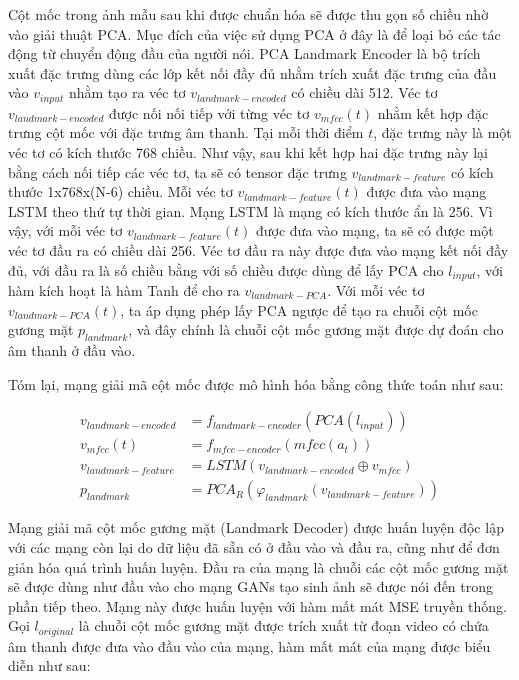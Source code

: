 Cột mốc trong ảnh mẫu sau khi được chuẩn hóa sẽ được thu gọn số chiều nhờ vào giải thuật PCA. Mục đích của việc sử dụng PCA ở đây là để loại bỏ các tác động từ chuyển động đầu của người nói. PCA Landmark Encoder là bộ trích xuất đặc trưng dùng các lớp kết nối đầy đủ nhằm trích xuất đặc trưng của đầu vào $v_{input}$ nhằm tạo ra véc tơ $v_{landmark-encoded}$ có chiều dài 512. Véc tơ $v_{landmark-encoded}$ được nối nối tiếp với từng véc tơ $v_{mfcc}(t)$ nhằm kết hợp đặc trưng cột mốc với đặc trưng âm thanh. Tại mỗi thời điểm $t$, đặc trưng này là một véc tơ có kích thước 768 chiều. Như vậy, sau khi kết hợp hai đặc trưng này lại bằng cách nối tiếp các véc tơ, ta sẽ có tensor đặc trưng $v_{landmark-feature}$ có kích thước 1x768x(N-6) chiều. Mỗi véc tơ $v_{landmark-feature}(t)$ được đưa vào mạng LSTM theo thứ tự thời gian. Mạng LSTM là mạng có kích thước ẩn là 256. Vì vậy, với mỗi véc tơ $v_{landmark-feature}(t)$ được đưa vào mạng, ta sẽ có được một véc tơ đầu ra có chiều dài 256. Véc tơ đầu ra này được đưa vào mạng kết nối đầy đủ, với đầu ra là số chiều bằng với số chiều được dùng để lấy PCA cho $l_{input}$, với hàm kích hoạt là hàm Tanh để cho ra $v_{landmark-PCA}$. Với mỗi véc tơ $v_{landmark-PCA}(t)$, ta áp dụng phép lấy PCA ngược để tạo ra chuỗi cột mốc gương mặt $p_{landmark}$, và đây chính là chuỗi cột mốc gương mặt được dự đoán cho âm thanh ở đầu vào.

Tóm lại, mạng giải mã cột mốc được mô hình hóa bằng công thức toán như sau:

\begin{equation}
    \begin{split}
    v_{landmark-encoded} &= f_{landmark-encoder}(PCA(l_{input}))\\
    v_{mfcc}(t) &= f_{mfcc-encoder}(mfcc(a_t))\\
    v_{landmark-feature} &= LSTM(v_{landmark-encoded} \oplus v_{mfcc})\\
    p_{landmark} &= PCA_R(\varphi_{landmark}(v_{landmark-feature}))
    \end{split}
\end{equation}

Mạng giải mã cột mốc gương mặt (Landmark Decoder) được huấn luyện độc lập với các mạng còn lại do dữ liệu đã sẵn có ở đầu vào và đầu ra, cũng như để đơn giản hóa quá trình huấn luyện. Đầu ra của mạng là chuỗi các cột mốc gương mặt sẽ được dùng như đầu vào cho mạng GANs tạo sinh ảnh sẽ được nói đến trong phần tiếp theo. Mạng này được huấn luyện với hàm mất mát MSE truyền thống. Gọi $l_{original}$ là chuỗi cột mốc gương mặt được trích xuất từ đoạn video có chứa âm thanh được đưa vào đầu vào của mạng, hàm mất mát của mạng được biểu diễn như sau:

